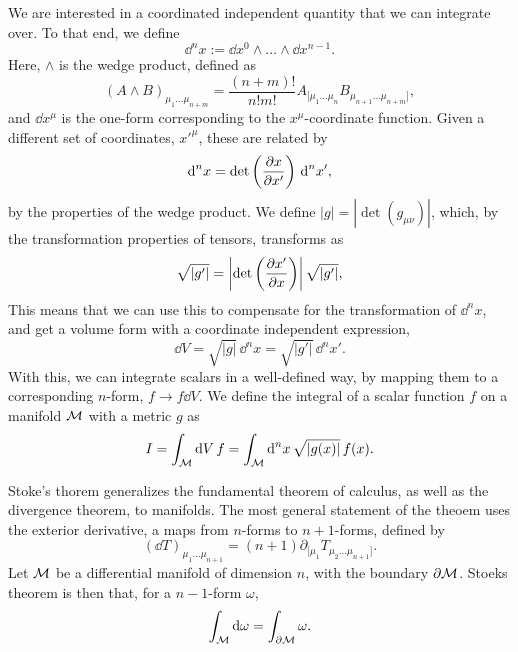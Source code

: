 We are interested in a coordinated independent quantity that we can integrate over.
To that end, we define
%
\begin{equation}
    \dd^n x := \dd x^0 \wedge \dots \wedge \dd x^{n-1}.
\end{equation}
%
Here, $\wedge$ is the wedge product, defined as
%
\begin{equation}
    (A\wedge B)_{\mu_1\dots\mu_{n+m}} = \frac{(n + m)!}{n! m!} A_{[\mu_1\dots\mu_n}B_{\mu_{n+1}\dots\mu_{n+m}]},
\end{equation}
%
and $\dd x^\mu$ is the one-form corresponding to the $x^\mu$-coordinate function.
Given a different set of coordinates, $x'^\mu$, these are related by
%
\begin{equation}
    \dd^n x = \det\left( \diffp{x}{x'} \right) \, \dd^n x',
\end{equation}
%
by the properties of the wedge product.
We define $|g| = |\det(g_{\mu \nu })|$, which, by the transformation properties of tensors, transforms as
%
\begin{equation}
    \sqrt{|g'|} = \left| \det\left(\diffp{x'}{x} \right) \right| \sqrt{|g'|},
\end{equation}
%
This means that we can use this to compensate for the transformation of $\dd^n x$, and get a volume form with a coordinate independent expression,
%
\begin{equation}
    \dd V = \sqrt{|g|} \, \dd^n x = \sqrt{|g'|} \, \dd^n x'.
\end{equation}
%
With this, we can integrate scalars in a well-defined way, by mapping them to a corresponding $n$-form, $f \rightarrow f \dd V$.
We define the integral of a scalar function $f$ on a manifold $\mathcal{M}$ with a metric $g$ as
%
\begin{equation}
    I = \int_{\mathcal{M}} \text{d} V \, f =  \int_{\mathcal{M}} \text{d}^n x \, \sqrt{|g(x)|} \, f(x).  
\end{equation}


Stoke's thorem generalizes the fundamental theorem of calculus, as well as the divergence theorem, to manifolds.
The most general statement of the theoem uses the exterior derivative, a maps from $n$-forms to $n+1$-forms, defined by
\begin{equation}
    (\dd T)_{\mu_1 \dots \mu_{n+1}} = (n+1) \partial_{[\mu_1} T_{\mu_2\dots\mu_{n+1}]}.
\end{equation}
Let $\mathcal{M}$ be a differential manifold of dimension $n$, with the boundary $\partial \mathcal{M}$.
Stoeks theorem is then that, for a $n-1$-form $\omega$, 
\begin{equation}
    \int_{\mathcal{M}} \text{d} \omega = \int_{\partial \mathcal{M}}  \omega. 
\end{equation}

